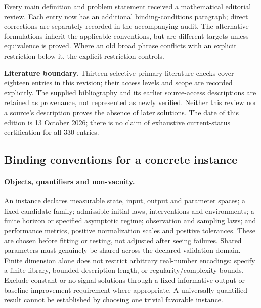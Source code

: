 \documentclass[11pt]{article}
\begin{document}
Every main definition and problem statement received a mathematical editorial review. Each entry now has an additional binding-conditions paragraph; direct corrections are separately recorded in the accompanying audit. The alternative formulations inherit the applicable conventions, but are different targets unless equivalence is proved. Where an old broad phrase conflicts with an explicit restriction below it, the explicit restriction controls.

\textbf{Literature boundary.} Thirteen selective primary-literature checks cover eighteen entries in this revision; their access levels and scope are recorded explicitly. The supplied bibliography and its earlier source-access descriptions are retained as provenance, not represented as newly verified. Neither this review nor a source's description proves the absence of later solutions. The date of this edition is 13 October 2026; there is no claim of exhaustive current-status certification for all 330 entries.

\subsection*{Binding conventions for a concrete instance}
\paragraph{Objects, quantifiers and non-vacuity.}
An instance declares measurable state, input, output and parameter spaces; a fixed candidate family; admissible initial laws, interventions and environments; a finite horizon or specified asymptotic regime; observation and sampling laws; and performance metrics, positive normalization scales and positive tolerances. These are chosen before fitting or testing, not adjusted after seeing failures. Shared parameters must genuinely be shared across the declared validation domain. Finite dimension alone does not restrict arbitrary real-number encodings: specify a finite library, bounded description length, or regularity/complexity bounds. Exclude constant or no-signal solutions through a fixed informative-output or baseline-improvement requirement where appropriate. A universally quantified result cannot be established by choosing one trivial favorable instance.
\end{document}

